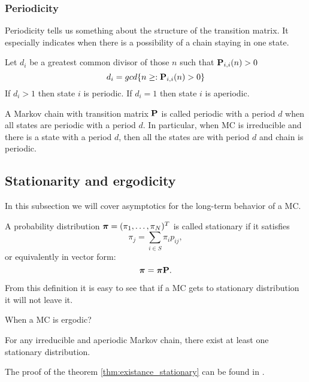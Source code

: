 	\subsubsection{Periodicity}
		Periodicity tells us something about the structure of the transition matrix. It especially indicates when there is a possibility of a chain staying in one state.
		\begin{definition}[Periodicity]
			Let $d_i$ be a greatest common divisor of those $n$ such that $\mathbf{P}_{i,i}(n)>0$ \ie
			\begin{equation*}
				d_i = gcd\{ n \geq : \mathbf{P}_{i,i}(n)>0 \}
			\end{equation*}
			If $d_i > 1$ then state $i$ is periodic. If $d_i = 1$ then state $i$ is aperiodic.
		\end{definition}
	
		\begin{definition}
			A Markov chain with transition matrix $\mathbf{P}$ is called periodic with a period $d$ when all states are periodic with a period $d$. In particular, when MC is irreducible and there is a state with a period $d$, then all the states are with period $d$ and chain is periodic.
		\end{definition}	
	

\subsection{Stationarity and ergodicity}
	In this subsection we will cover asymptotics for the long-term behavior of a MC.
	\begin{definition}[Stationarity]
		A probability distribution $\boldsymbol{\pi} = (\pi_1, \ldots, \pi_N)^T$ is called stationary if it satisfies
		\begin{equation*}
			\pi_j = \sum_{i \in S} \pi_i p_{ij},
		\end{equation*}
		or equivalently in vector form:
		\begin{equation*}
			\boldsymbol{\pi} = \boldsymbol{\pi} \mathbf{P}.
		\end{equation*}
	\end{definition}
	From this definition it is easy to see that if a MC gets to stationary distribution it will not leave it. 
	
	\begin{definition}[Ergodicity]
		When a MC is ergodic?
	\end{definition}
	
	\begin{theorem} \label{thm:existance_stationary}
		For any irreducible and aperiodic Markov chain, there exist at least one stationary distribution.
	\end{theorem}
	The proof of the theorem \ref{thm:existance_stationary} can be found in \cite{haggstrom2002finite}.
	
